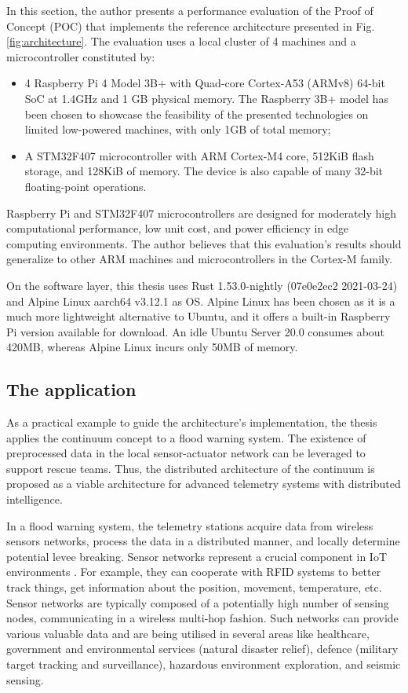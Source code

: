 In this section, the author presents a performance evaluation of the Proof of Concept (POC) that implements the reference architecture presented in Fig. \ref{fig:architecture}. The evaluation uses a local cluster of 4 machines and a microcontroller constituted by:

\begin{itemize}
    \item 4 Raspberry Pi 4 Model 3B+ with Quad-core Cortex-A53 (ARMv8) 64-bit SoC at 1.4GHz and 1 GB physical memory. The Raspberry 3B+ model has been chosen to showcase the feasibility of the presented technologies on limited low-powered machines, with only 1GB of total memory;
    \item A STM32F407 microcontroller with ARM Cortex-M4 core, 512KiB flash storage, and 128KiB of memory. The device is also capable of many 32-bit floating-point operations.
\end{itemize}

Raspberry Pi and STM32F407 microcontrollers are designed for moderately high computational performance, low unit cost, and power efficiency in edge computing environments. The author believes that this evaluation's results should generalize to other ARM machines and microcontrollers in the Cortex-M family.

On the software layer, this thesis uses Rust 1.53.0-nightly (07e0e2ec2 2021-03-24) and Alpine Linux aarch64 v3.12.1 as OS. Alpine Linux has been chosen as it is a much more lightweight alternative to Ubuntu, and it offers a built-in Raspberry Pi version available for download. An idle Ubuntu Server 20.0 consumes about 420MB, whereas Alpine Linux incurs only 50MB of memory.

\subsection{The application}

As a practical example to guide the architecture's implementation, the thesis applies the continuum concept to a flood warning system. The existence of preprocessed data in the local sensor-actuator network can be leveraged to support rescue teams. Thus, the distributed architecture of the continuum is proposed as a viable architecture for advanced telemetry systems with distributed intelligence.

In a flood warning system, the telemetry stations acquire data from wireless sensors networks, process the data in a distributed manner, and locally determine potential levee breaking. Sensor networks represent a crucial component in IoT environments \cite{yu2017survey}. For example, they can cooperate with RFID systems to better track things, get information about the position, movement, temperature, etc. Sensor networks are typically composed of a potentially high number of sensing nodes, communicating in a wireless multi-hop fashion. Such networks can provide various valuable data and are being utilised in several areas like healthcare, government and environmental services (natural disaster relief), defence (military target tracking and surveillance), hazardous environment exploration, and seismic sensing.

